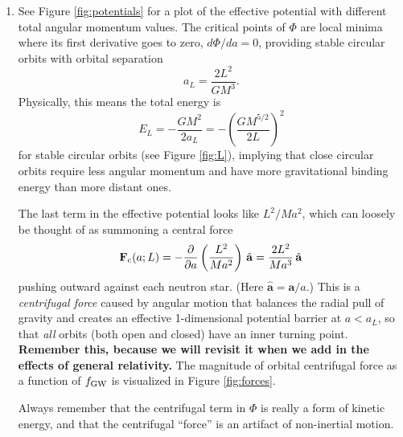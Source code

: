 \documentclass[11pt]{article}
\begin{document}
\begin{enumerate}
\item See Figure \ref{fig:potentials} for a plot of the effective potential with different total angular momentum values. The critical points of $\Phi$ are local minima where its first derivative goes to zero, $d\Phi/da = 0$, providing stable circular orbits with orbital separation
\begin{equation}\label{eq:aL}
a_L = \frac{2L^2}{GM^3}.
\end{equation}
Physically, this means the total energy is
\begin{equation}\label{eq:energy}
E_L = -\frac{GM^2}{2a_L} = - \left( \frac{GM^{5/2}}{2L} \right)^2
\end{equation} for stable circular orbits (see Figure \ref{fig:L}), implying that close circular orbits require less angular momentum and have more gravitational binding energy than more distant ones.

\hspace{15pt} The last term in the effective potential looks like $L^2/Ma^2$, which can loosely be thought of as summoning a central force
\begin{equation}
\mathbf{F}_{\rm c}(a; L) = -\frac{\partial}{\partial a}\left(\frac{L^2}{Ma^2}\right) \, \hat{\mathbf{a}} = \frac{2L^2}{Ma^3} \, \hat{\mathbf{a}}
\end{equation}
pushing outward against each neutron star. (Here $\hat{\mathbf{a}} = \mathbf{a}/a$.) This is a \textit{centrifugal force} caused by angular motion that balances the radial pull of gravity and creates an effective 1-dimensional potential barrier at $a < a_L$, so that \emph{all} orbits (both open and closed) have an inner turning point. \textbf{Remember this, because we will revisit it when we add in the effects of general relativity.} The magnitude of orbital centrifugal force as a function of $f_{\rm GW}$ is visualized in Figure \ref{fig:forces}.

\hspace{15pt} Always remember that the centrifugal term in $\Phi$ is really a form of kinetic energy, and that the centrifugal ``force'' is an artifact of non-inertial motion.


\end{enumerate}
\end{document}
